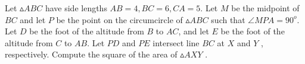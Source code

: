 Let $\vartriangle ABC$ have side lengths $AB = 4,BC = 6,CA = 5$. Let $M$ be the midpoint of $BC$ and let $P$ be the point on the circumcircle of $\vartriangle ABC$ such that $\angle MPA = 90^o$. Let $D$ be the foot of the altitude from $B$ to $AC$, and let $E$ be the foot of the altitude from $C$ to $AB$. Let $PD$ and $PE$ intersect line $BC$ at $X$ and $Y$ , respectively. Compute the square of the area of $\vartriangle AXY$ .